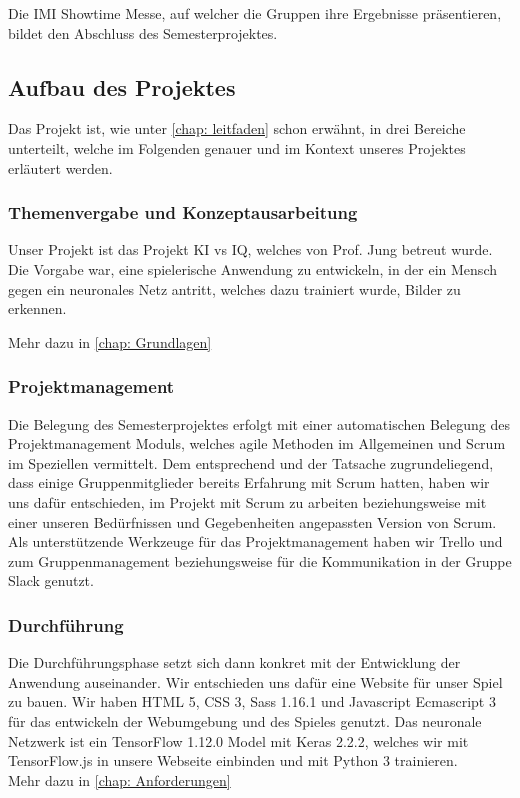 \documentclass[11pt]{article}
\begin{document}
Die IMI Showtime Messe, auf welcher die Gruppen ihre Ergebnisse präsentieren, bildet den Abschluss des Semesterprojektes.

\subsection{Aufbau des Projektes}

Das Projekt ist, wie unter \autoref{chap: leitfaden} schon erwähnt, in drei Bereiche unterteilt, welche im Folgenden genauer und im Kontext unseres Projektes erläutert werden.

\subsubsection{ Themenvergabe und Konzeptausarbeitung }
\label{chap: Themenvergabe}

Unser Projekt ist das Projekt KI vs IQ, welches von Prof. Jung betreut wurde.
Die Vorgabe war, eine spielerische Anwendung zu entwickeln, in der ein Mensch gegen ein neuronales Netz antritt, welches dazu trainiert wurde, Bilder zu erkennen.

Mehr dazu in \autoref{chap: Grundlagen}
	
\subsubsection{  Projektmanagement }
\label{chap: Projektmanagement}
Die Belegung des Semesterprojektes erfolgt mit einer automatischen Belegung des Projektmanagement Moduls, welches agile Methoden im Allgemeinen und Scrum im Speziellen vermittelt. Dem entsprechend und der Tatsache zugrundeliegend, dass einige Gruppenmitglieder bereits Erfahrung mit Scrum hatten, haben wir uns dafür entschieden, im Projekt mit Scrum zu arbeiten beziehungsweise mit einer unseren Bedürfnissen und Gegebenheiten angepassten Version von Scrum.\\
Als unterstützende Werkzeuge für das Projektmanagement haben wir Trello und zum Gruppenmanagement beziehungsweise für die Kommunikation in der Gruppe Slack genutzt.

\subsubsection{ Durchführung }
\label{chap: durchfuhrung}
Die Durchführungsphase setzt sich dann konkret mit der Entwicklung der Anwendung auseinander. Wir entschieden uns dafür eine Website für unser Spiel zu bauen. Wir haben HTML 5, CSS 3, Sass 1.16.1 und Javascript Ecmascript 3 für das entwickeln der Webumgebung und des Spieles genutzt. Das neuronale Netzwerk ist ein TensorFlow 1.12.0 Model mit Keras 2.2.2, welches wir mit TensorFlow.js in unsere Webseite einbinden und mit Python 3 trainieren.\\
Mehr dazu in \autoref{chap: Anforderungen}
\end{document}
